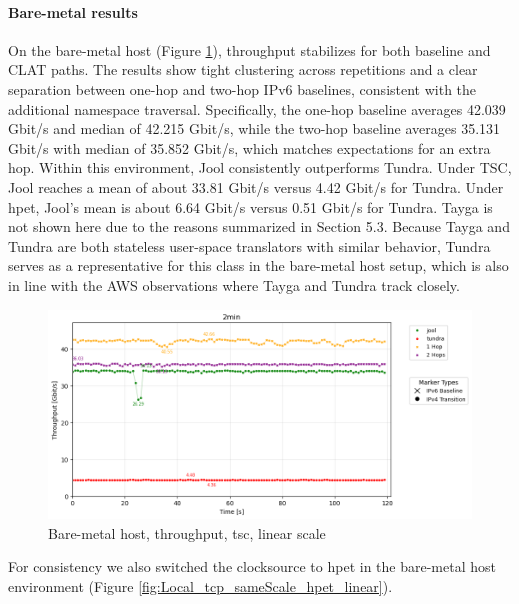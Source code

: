 \paragraph{Bare-metal results}

On the bare-metal host (Figure \ref{fig:Local_tcp_sameScale_tsc_linear}), throughput stabilizes for both baseline and CLAT paths. The results show tight clustering across repetitions and a clear separation between one-hop and two-hop IPv6 baselines, consistent with the additional namespace traversal. Specifically, the one-hop baseline averages 42.039 Gbit/s and median of 42.215 Gbit/s, while the two-hop baseline averages 35.131 Gbit/s with median of 35.852 Gbit/s, which matches expectations for an extra hop. Within this environment, Jool consistently outperforms Tundra. Under TSC, Jool reaches a mean of about 33.81 Gbit/s versus 4.42 Gbit/s for Tundra. Under hpet, Jool's mean is about 6.64 Gbit/s versus 0.51 Gbit/s for Tundra. Tayga is not shown here due to the reasons summarized in Section 5.3. Because Tayga and Tundra are both stateless user-space translators with similar behavior, Tundra serves as a representative for this class in the bare-metal host setup, which is also in line with the AWS observations where Tayga and Tundra track closely.

\begin{figure}[H]
    \centering
    \includegraphics[width=1\textwidth]{resources/finalPlots/combinedplots/SingleLocal_tcp_sameScale_tsc_2min_linear.png}
    \caption{Bare-metal host, throughput, tsc, linear scale}
    \label{fig:Local_tcp_sameScale_tsc_linear}
\end{figure}

For consistency we also switched the clocksource to hpet in the bare-metal host environment (Figure \ref{fig:Local_tcp_sameScale_hpet_linear}).

